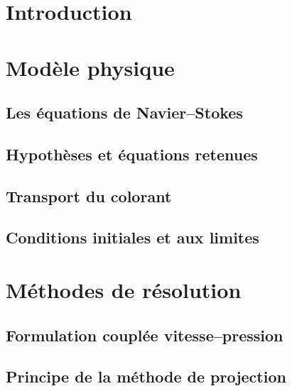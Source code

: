 \documentclass[a4paper,12pt,twoside]{article}
\begin{document}
    

    \null
    \thispagestyle{empty}
    \newpage

    \tableofcontents
    
    \clearpage

    \section{Introduction}
        

    \section{Modèle physique}
        \subsection{Les équations de Navier--Stokes}
        
        
        \subsection{Hypothèses et équations retenues}
        

        \subsection{Transport du colorant}
        

        \subsection{Conditions initiales et aux limites}
        

    \section{Méthodes de résolution}
        \subsection{Formulation couplée vitesse--pression}
        \subsection{Principe de la méthode de projection}
\end{document}
